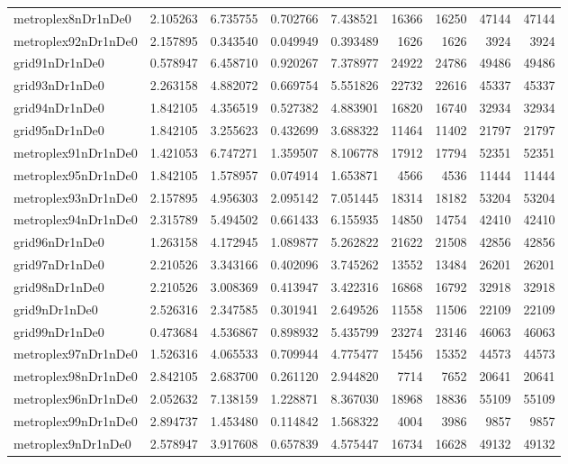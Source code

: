 \begin{longtable}{|l|r|r|r|r|r|r|r|r|}
metroplex8nDr1nDe0 & 2.105263 & 6.735755 & 0.702766 & 7.438521 & 16366 & 16250 & 47144 & 47144 \\
metroplex92nDr1nDe0 & 2.157895 & 0.343540 & 0.049949 & 0.393489 & 1626 & 1626 & 3924 & 3924 \\
grid91nDr1nDe0 & 0.578947 & 6.458710 & 0.920267 & 7.378977 & 24922 & 24786 & 49486 & 49486 \\
grid93nDr1nDe0 & 2.263158 & 4.882072 & 0.669754 & 5.551826 & 22732 & 22616 & 45337 & 45337 \\
grid94nDr1nDe0 & 1.842105 & 4.356519 & 0.527382 & 4.883901 & 16820 & 16740 & 32934 & 32934 \\
grid95nDr1nDe0 & 1.842105 & 3.255623 & 0.432699 & 3.688322 & 11464 & 11402 & 21797 & 21797 \\
metroplex91nDr1nDe0 & 1.421053 & 6.747271 & 1.359507 & 8.106778 & 17912 & 17794 & 52351 & 52351 \\
metroplex95nDr1nDe0 & 1.842105 & 1.578957 & 0.074914 & 1.653871 & 4566 & 4536 & 11444 & 11444 \\
metroplex93nDr1nDe0 & 2.157895 & 4.956303 & 2.095142 & 7.051445 & 18314 & 18182 & 53204 & 53204 \\
metroplex94nDr1nDe0 & 2.315789 & 5.494502 & 0.661433 & 6.155935 & 14850 & 14754 & 42410 & 42410 \\
grid96nDr1nDe0 & 1.263158 & 4.172945 & 1.089877 & 5.262822 & 21622 & 21508 & 42856 & 42856 \\
grid97nDr1nDe0 & 2.210526 & 3.343166 & 0.402096 & 3.745262 & 13552 & 13484 & 26201 & 26201 \\
grid98nDr1nDe0 & 2.210526 & 3.008369 & 0.413947 & 3.422316 & 16868 & 16792 & 32918 & 32918 \\
grid9nDr1nDe0 & 2.526316 & 2.347585 & 0.301941 & 2.649526 & 11558 & 11506 & 22109 & 22109 \\
grid99nDr1nDe0 & 0.473684 & 4.536867 & 0.898932 & 5.435799 & 23274 & 23146 & 46063 & 46063 \\
metroplex97nDr1nDe0 & 1.526316 & 4.065533 & 0.709944 & 4.775477 & 15456 & 15352 & 44573 & 44573 \\
metroplex98nDr1nDe0 & 2.842105 & 2.683700 & 0.261120 & 2.944820 & 7714 & 7652 & 20641 & 20641 \\
metroplex96nDr1nDe0 & 2.052632 & 7.138159 & 1.228871 & 8.367030 & 18968 & 18836 & 55109 & 55109 \\
metroplex99nDr1nDe0 & 2.894737 & 1.453480 & 0.114842 & 1.568322 & 4004 & 3986 & 9857 & 9857 \\
metroplex9nDr1nDe0 & 2.578947 & 3.917608 & 0.657839 & 4.575447 & 16734 & 16628 & 49132 & 49132 \\
\end{longtable}

